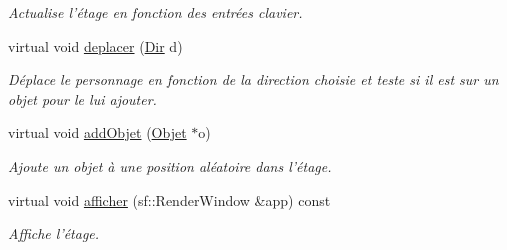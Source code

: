 \begin{DoxyCompactItemize}
\begin{DoxyCompactList}\small\item\em Actualise l'étage en fonction des entrées clavier. \end{DoxyCompactList}\item 
virtual void \hyperlink{classEtage_aa758fb7cb5fc6ff2e8728807774f5df8}{deplacer} (\hyperlink{Espace_8h_a7cf6e8c5a5bc5e7b2afef3647870b1c4}{Dir} d)
\begin{DoxyCompactList}\small\item\em Déplace le personnage en fonction de la direction choisie et teste si il est sur un objet pour le lui ajouter. \end{DoxyCompactList}\item 
virtual void \hyperlink{classEtage_aa1d74726de7b9db8322d5eaac59f36c4}{add\-Objet} (\hyperlink{classObjet}{Objet} $\ast$o)
\begin{DoxyCompactList}\small\item\em Ajoute un objet à une position aléatoire dans l'étage. \end{DoxyCompactList}\item 
virtual void \hyperlink{classEtage_af1b2fb877236cdb018d04e4b7e7a05ca}{afficher} (sf\-::\-Render\-Window \&app) const 
\begin{DoxyCompactList}\small\item\em Affiche l'étage. \end{DoxyCompactList}\end{DoxyCompactItemize}
